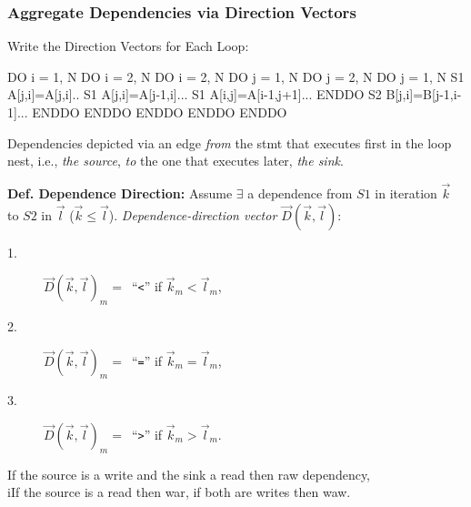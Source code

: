 \documentclass{beamer}
\newcommand{\emp}[1]{\textcolor{DikuRed}{ #1}}
\begin{document}
\begin{frame}[fragile,t]
  \frametitle{Aggregate Dependencies via Direction Vectors} %

\begin{block}{Write the Direction Vectors for Each Loop:}
\begin{colorcode}
  DO i = 1, N            DO i = 2, N               DO i = 2, N
    DO j = 1, N            DO j = 2, N               DO j = 1, N 
S1    A[j,i]=A[j,i]..  S1   A[j,i]=A[j-1,i]...   S1    A[i,j]=A[i-1,j+1]...
    ENDDO              S2   B[j,i]=B[j-1,i-1]...     ENDDO
  ENDDO                  ENDDO ENDDO               ENDDO
\end{colorcode}
\end{block} 



\smallskip

Dependencies depicted via an edge {\em from} the stmt that executes first
in the loop nest, i.e., {\em the source}, {\em to} the one that executes later, {\em the sink}.

\smallskip

{\bf Def. Dependence Direction:} Assume $\exists$ a dependence from $S1$ in iteration $\vec{k}$
to $S2$ in $\vec{l}$ ($\vec{k}\leq\vec{l}$). 
\emp{\em Dependence-direction vector $\vec{D}(\vec{k},\vec{l})$}:
\begin{description}
    \item[1.] $\vec{D}(\vec{k},\vec{l})_m = $~``{\tt{}<}'' if $\vec{k}_m < \vec{l}_m$,
    \item[2.] $\vec{D}(\vec{k},\vec{l})_m = $~``{\tt{}=}'' if $\vec{k}_m = \vec{l}_m$,
    \item[3.] $\vec{D}(\vec{k},\vec{l})_m = $~``{\tt{}>}'' if $\vec{k}_m > \vec{l}_m$.
\end{description}

\medskip
If the source is a write and the sink a read then {\sc raw} dependency,\\iIf the source is a read then {\sc war}, if both are writes then {\sc waw}.  
\end{frame}
\end{document}
